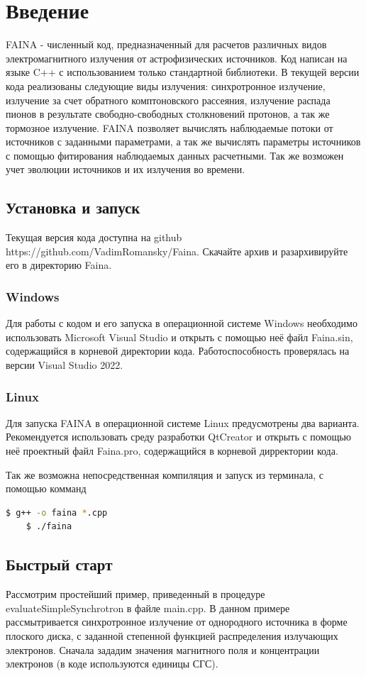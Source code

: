 \chapter*{Введение}		
FAINA - численный код, предназначенный для расчетов различных видов электромагнитного излучения от астрофизических источников. Код написан на языке C++ с использованием только стандартной библиотеки. В текущей версии кода реализованы следующие виды излучения: синхротронное излучение, излучение за счет обратного комптоновского рассеяния, излучение распада пионов в результате свободно-свободных столкновений протонов, а так же тормозное излучение. FAINA позволяет вычислять наблюдаемые потоки от источников с заданными параметрами, а так же вычислять параметры источников с помощью фитирования наблюдаемых данных расчетными. Так же возможен учет эволюции источников и их излучения во времени.

\section*{Установка и запуск}
Текущая версия кода доступна на github https://github.com/VadimRomansky/Faina. Скачайте архив и разархивируйте его в директорию Faina.
\subsection*{Windows}
Для работы с кодом и его запуска в операционной системе Windows необходимо использовать Microsoft Visual Studio и открыть с помощью неё файл Faina.sin, содержащийся в корневой директории кода. Работоспособность проверялась на версии Visual Studio 2022.
\subsection*{Linux}
Для запуска FAINA в операционной системе Linux предусмотрены два варианта. Рекомендуется использовать среду разработки QtCreator и открыть с помощью неё проектный файл Faina.pro, содержащийся в корневой дирректории кода. 

Так же возможна непосредственная компиляция и запуск из терминала, с помощью комманд
\begin{lstlisting}[language=bash]
	$ g++ -o faina *.cpp
	$ ./faina
\end{lstlisting}
\section*{Быстрый старт}\label{quickStart}
Рассмотрим простейший пример, приведенный в процедуре evaluateSimpleSynchrotron в файле main.cpp. В данном примере рассмытривается синхротронное излучение от однородного источника в форме плоского диска, с заданной степенной функцией распределения излучающих электронов. Сначала зададим значения магнитного поля и концентрации электронов (в коде используются единицы СГС).

